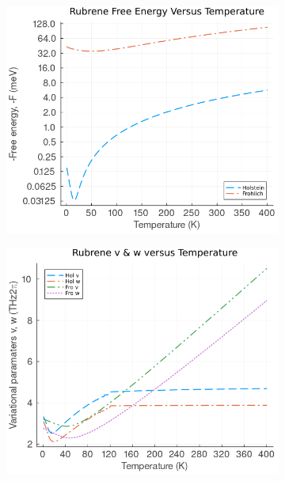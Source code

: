 \begin{figure}[!tbp]
    \centering
  \begin{subfigure}[b]{0.49\textwidth}
    \centering
    \includegraphics[width=\textwidth]{figures/rubrene_F_temp.png}
    \label{fig:rubrene_F_temp}
  \end{subfigure}
  \hfill
  \begin{subfigure}[b]{0.49\textwidth}
    \centering
    \includegraphics[width=\textwidth]{figures/rubrene_vw_temp.png}
    \label{fig:rubene_vw_temp}
  \end{subfigure}

\end{figure}
